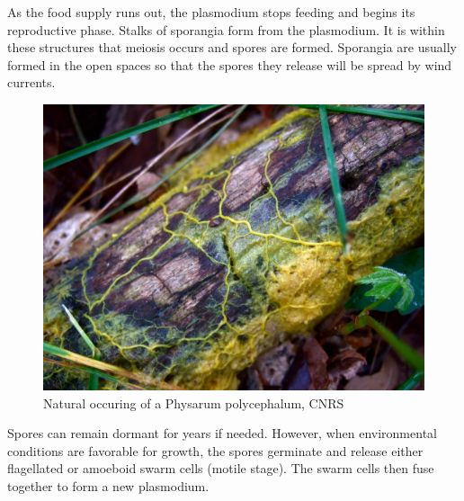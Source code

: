 \par
As the food supply runs out, the plasmodium stops feeding and begins its reproductive phase. Stalks of sporangia form from the plasmodium. It is within these structures that meiosis occurs and spores are formed. Sporangia are usually formed in the open spaces so that the spores they release will be spread by wind currents.

\begin{figure}
  \centering
    \includegraphics[width=1\textwidth]{nature_2}%
    
  \caption{Natural occuring of a Physarum polycephalum, \textcopyright CNRS}
  \label{fig:PhysarumCNRS2880x1500}
\end{figure}

\par
Spores can remain dormant for years if needed. However, when environmental conditions are favorable for growth, the spores germinate and release either flagellated or amoeboid swarm cells (motile stage). The swarm cells then fuse together to form a new plasmodium. 